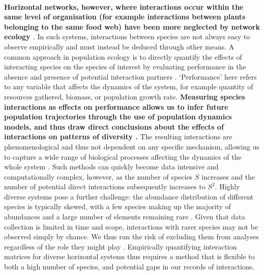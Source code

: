 \documentclass[a4,12pt]{article}
\begin{document}
\begin{refsection}
    \paragraph{} 
    \textbf{Horizontal networks, however, where interactions occur within the same level of organisation (for example interactions between plants belonging to the same food web) have been more neglected by network ecology \parencite{Ellison2019}}. In such systems, interactions between species are not always easy to observe empirically and must instead be deduced through other means. A common approach in population ecology is to directly quantify the effects of interacting species on the species of interest by evaluating performance in the absence and presence of potential interaction partners \parencite{Connell1961, Grace1990}. `Performance' here refers to any variable that affects the dynamics of the system, for example quantity of resources gathered, biomass, or population growth rate. \textbf{Measuring species interactions as effects on performance allows us to infer future population trajectories through the use of population dynamics models, and thus draw direct conclusions about the effects of interactions on patterns of diversity \parencite{Laska1998}.} The resulting interactions are phenomenological and thus not dependent on any specific mechanism, allowing us to capture a wide range of biological processes affecting the dynamics of the whole system \parencite{Novak2010}. Such methods can quickly become data intensive and computationally complex, however, as the number of species $S$ increases and the number of potential direct interactions subsequently increases to $S^2$. Highly diverse systems pose a further challenge: the abundance distribution of different species is typically skewed, with a few species making up the majority of abundances and a large number of elements remaining rare \parencite{Fisher1943}. Given that data collection is limited in time and scope, interactions with rarer species may not be observed simply by chance. We thus run the risk of excluding them from analyses regardless of the role they might play \parencite{Olesen2011}. Empirically quantifying interaction matrices for diverse horizontal systems thus requires a method that is flexible to both a high number of species, and potential gaps in our records of interactions. 


\end{refsection}
\end{document}
